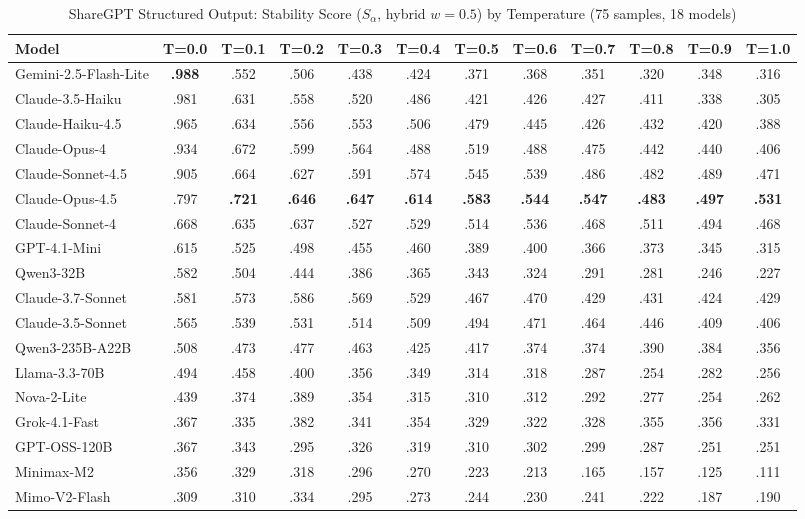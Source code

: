 \documentclass{article}
\theoremstyle{plain}
\theoremstyle{definition}
\begin{document}
\begin{table}[t]
\centering
\caption{ShareGPT Structured Output: Stability Score ($S_\alpha$, hybrid $w{=}0.5$) by Temperature (75 samples, 18 models)}
\label{tab:overall-consistency-temp}
\scriptsize
\begin{tabular}{@{}lccccccccccc@{}}
\toprule
\textbf{Model} & \textbf{T=0.0} & \textbf{T=0.1} & \textbf{T=0.2} & \textbf{T=0.3} & \textbf{T=0.4} & \textbf{T=0.5} & \textbf{T=0.6} & \textbf{T=0.7} & \textbf{T=0.8} & \textbf{T=0.9} & \textbf{T=1.0} \\
\midrule
Gemini-2.5-Flash-Lite & \textbf{.988} & .552 & .506 & .438 & .424 & .371 & .368 & .351 & .320 & .348 & .316 \\
Claude-3.5-Haiku & .981 & .631 & .558 & .520 & .486 & .421 & .426 & .427 & .411 & .338 & .305 \\
Claude-Haiku-4.5 & .965 & .634 & .556 & .553 & .506 & .479 & .445 & .426 & .432 & .420 & .388 \\
Claude-Opus-4 & .934 & .672 & .599 & .564 & .488 & .519 & .488 & .475 & .442 & .440 & .406 \\
Claude-Sonnet-4.5 & .905 & .664 & .627 & .591 & .574 & .545 & .539 & .486 & .482 & .489 & .471 \\
Claude-Opus-4.5 & .797 & \textbf{.721} & \textbf{.646} & \textbf{.647} & \textbf{.614} & \textbf{.583} & \textbf{.544} & \textbf{.547} & \textbf{.483} & \textbf{.497} & \textbf{.531} \\
Claude-Sonnet-4 & .668 & .635 & .637 & .527 & .529 & .514 & .536 & .468 & .511 & .494 & .468 \\
GPT-4.1-Mini & .615 & .525 & .498 & .455 & .460 & .389 & .400 & .366 & .373 & .345 & .315 \\
Qwen3-32B & .582 & .504 & .444 & .386 & .365 & .343 & .324 & .291 & .281 & .246 & .227 \\
Claude-3.7-Sonnet & .581 & .573 & .586 & .569 & .529 & .467 & .470 & .429 & .431 & .424 & .429 \\
Claude-3.5-Sonnet & .565 & .539 & .531 & .514 & .509 & .494 & .471 & .464 & .446 & .409 & .406 \\
Qwen3-235B-A22B & .508 & .473 & .477 & .463 & .425 & .417 & .374 & .374 & .390 & .384 & .356 \\
Llama-3.3-70B & .494 & .458 & .400 & .356 & .349 & .314 & .318 & .287 & .254 & .282 & .256 \\
Nova-2-Lite & .439 & .374 & .389 & .354 & .315 & .310 & .312 & .292 & .277 & .254 & .262 \\
Grok-4.1-Fast & .367 & .335 & .382 & .341 & .354 & .329 & .322 & .328 & .355 & .356 & .331 \\
GPT-OSS-120B & .367 & .343 & .295 & .326 & .319 & .310 & .302 & .299 & .287 & .251 & .251 \\
Minimax-M2 & .356 & .329 & .318 & .296 & .270 & .223 & .213 & .165 & .157 & .125 & .111 \\
Mimo-V2-Flash & .309 & .310 & .334 & .295 & .273 & .244 & .230 & .241 & .222 & .187 & .190 \\
\bottomrule
\end{tabular}


\end{table}
\end{document}
